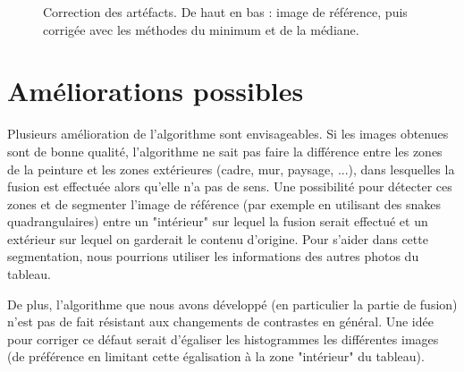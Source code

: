 \documentclass[12pt,a4paper]{article}
\begin{document}
\begin{figure}
\begin{minipage}{0.6\linewidth}
\end{minipage}
\caption{Correction des artéfacts. De haut en bas : image de référence, puis corrigée avec les méthodes du minimum et de la médiane.}
\label{mediane}
\end{figure} 
\section{Améliorations possibles}

Plusieurs amélioration de l'algorithme sont envisageables. Si les images obtenues sont de bonne qualité, l'algorithme ne sait pas faire la différence entre les zones de la peinture et les zones extérieures (cadre, mur, paysage, ...), dans lesquelles la fusion est effectuée alors qu'elle n'a pas de sens. Une possibilité pour détecter ces zones et de segmenter l'image de référence (par exemple en utilisant des snakes quadrangulaires) entre un "intérieur" sur lequel la fusion serait effectué et un extérieur sur lequel on garderait le contenu d'origine. Pour s'aider dans cette segmentation, nous pourrions utiliser les informations des autres photos du tableau.

De plus, l'algorithme que nous avons développé (en particulier la partie de fusion) n'est pas de fait résistant aux changements de contrastes en général. Une idée pour corriger ce défaut serait d'égaliser les histogrammes les différentes images (de préférence en limitant cette égalisation à la zone "intérieur" du tableau).


\end{document}

